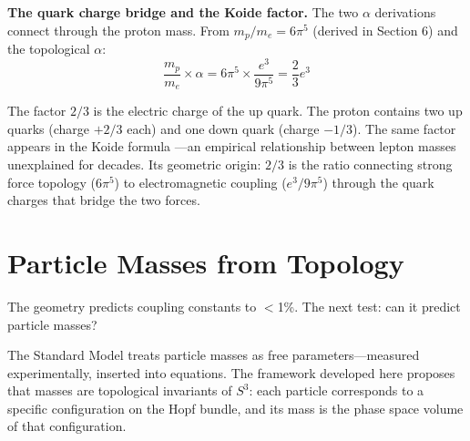 \documentclass[12pt]{article}
\begin{document}
\medskip
\textbf{The quark charge bridge and the Koide factor.} The two $\alpha$ derivations connect through the proton mass. From $m_p/m_e = 6\pi^5$ (derived in Section 6) and the topological $\alpha$:
$$\frac{m_p}{m_e} \times \alpha = 6\pi^5 \times \frac{e^3}{9\pi^5} = \frac{2}{3}e^3$$

The factor $2/3$ is the electric charge of the up quark. The proton contains two up quarks (charge $+2/3$ each) and one down quark (charge $-1/3$). The same factor appears in the Koide formula \cite{koide1983}---an empirical relationship between lepton masses unexplained for decades. Its geometric origin: $2/3$ is the ratio connecting strong force topology ($6\pi^5$) to electromagnetic coupling ($e^3/9\pi^5$) through the quark charges that bridge the two forces.

\begin{center}
\end{center}
\section{Particle Masses from Topology}

The geometry predicts coupling constants to $<$1\%. The next test: can it predict particle masses?

The Standard Model treats particle masses as free parameters---measured experimentally, inserted into equations. The framework developed here proposes that masses are topological invariants of $S^3$: each particle corresponds to a specific configuration on the Hopf bundle, and its mass is the phase space volume of that configuration.
\end{document}
